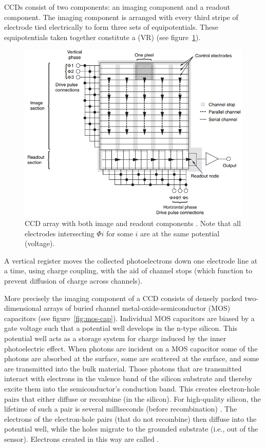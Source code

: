 CCDs consist of two components: an imaging component and a readout component.
%
The imaging component is arranged with every third stripe of electrode tied electrically to form three sets of equipotentials.
%
These equipotentials taken together constitute a  (VR) (see figure~\ref{fig:ccd-array}).
\begin{figure}[!htbp]
	\centering
	\includegraphics[width=.8\textwidth,keepaspectratio]{figures/background/ccd_array.png}
	\caption{CCD array with both image and readout components \cite{pawley1995handbook}. Note that all electrodes intersecting \(\Phi i\) for some \(i\) are at the same potential (voltage).}
	\label{fig:ccd-array}
\end{figure}
%
A vertical register moves the collected photoelectrons down one electrode line at a time, using charge coupling, with the aid of channel stops (which function to prevent diffusion of charge across channels).

More precisely the imaging component of a CCD consists of densely packed two-dimensional arrays of buried channel metal-oxide-semiconductor (MOS) capacitors (see figure~\ref{fig:mos-cap}).
%
Individual MOS capacitors are biased by a gate voltage such that a potential well develops in the n-type silicon.
%
This potential well acts as a storage system for charge induced by the inner photoelectric effect.
%
When photons are incident on a MOS capacitor some of the photons are absorbed at the surface, some are scattered at the surface, and some are transmitted into the bulk material.
%
Those photons that are transmitted interact with electrons in the valence band of the silicon substrate and thereby excite them into the semiconductor's conduction band.
%
This creates electron-hole pairs that either diffuse or recombine (in the silicon).
%
For high-quality silicon, the lifetime of such a pair is several milliseconds (before recombination) \cite{scientificccd}.
%
The electrons of the electron-hole pairs (that do not recombine) then diffuse into the potential well, while the holes migrate to the grounded substrate (i.e., out of the sensor).
%
Electrons created in this way are called .

